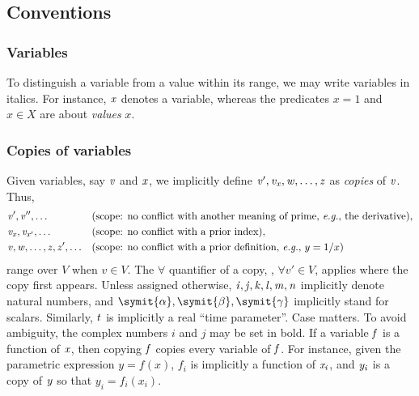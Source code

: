 \subsection{Conventions}%
\subsubsection{Variables}
To distinguish a variable from a value within its range, we may write variables in italics. For instance, $\mathit{x}$ denotes %
a variable, whereas the predicates $x=1$ and $x \in X$ are about \emph{values} $x$. %
% 
\subsubsection{Copies of variables}%
Given variables, say $\mathit{v}$ and $\mathit{x}$, we implicitly define %
$\mathit{v'}, \mathit{v}_{\mathit{x}}, \mathit{w}, \dots, \mathit{z}$ as \emph{copies} of $\mathit{v}$. Thus, 
% 
\begin{align} 
  &\varit{v'}, \varit{v''}, \dots && (\text{scope: no conflict with another meaning of prime, \eg, the derivative}),\\
  &\varit{v}_{\varit{x}}, \varit{v}_{\varit{x'}}, \dots && (\text{scope: no conflict with a prior index}),\\
  &\varit{v}, \varit{w}, \dots, \varit{z}, \varit{z'}, \dots && (\text{scope: no conflict with a prior definition, %
  \eg, $y=1/x$})
\end{align}
% 
range over $V$ when $v\in V$. The $\forall$ quantifier of a copy, \eg, $\forall v'\in V$, applies where the copy first %
appears. Unless assigned otherwise, $\mathit{i},\mathit{j}, \mathit{k}, \mathit{l}, \mathit{m}, \mathit{n}$ implicitly denote %
natural numbers, and $\symit{\alpha}, \symit{\beta}, \symit{\gamma}$ implicitly stand for scalars. Similarly, $\mathit{t}$ is 
implicitly a real ``time parameter''. Case matters. To avoid ambiguity, the complex numbers $i$ and $j$ may be set in bold. %
If a variable $\mathit{f}$ is a function of $\mathit{x}$, then copying $\mathit{f}$ copies every variable of $\mathit{f}$. %
For instance, given the parametric expression $y=f(x)$, $f_i$ is implicitly a function of $\mathit{x}_{\mathit{i}}$, and %
$\mathit{y}_{\mathit{i}}$ is a copy of $\mathit{y}$ so that $y_i=f_i(x_i)$. 
% 
